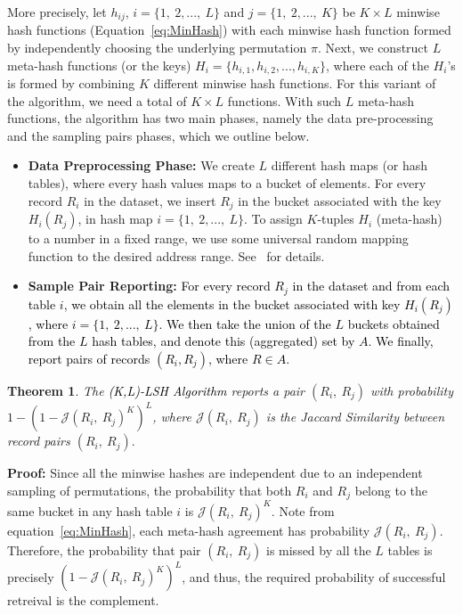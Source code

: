 \documentclass{imsart}
\newtheorem{theorem}{Theorem}
\begin{document}
More precisely, let $h_{ij}$, $i = \{1, \ 2,...,\ L\}$ and $j = \{1, \ 2,...,\ K\}$ be $K \times L$ minwise hash functions (Equation~\ref{eq:MinHash}) with each minwise hash function formed by independently choosing the underlying permutation $\pi$. Next, we construct $L$ meta-hash functions (or the keys) $H_i = \{h_{i,1}, h_{i,2},...,h_{i,K}\}$, where each of the $H_i$'s is formed by combining $K$ different minwise hash functions. For this variant of the algorithm, we need a total of $K \times L$ functions. With such $L$ meta-hash functions, the algorithm has two main phases, namely the data pre-processing and the sampling pairs phases, which we outline below.

\begin{itemize}
  \item {\bf Data Preprocessing Phase:} We create $L$ different hash maps (or hash tables), where every hash values maps to a bucket of elements.  For every record $R_i$ in the dataset, we insert $R_j$ in the bucket associated  with the key $H_i(R_j)$, in hash map $i = \{1, \ 2, ..., \ L\}$. To assign $K$-tuples $H_i$ (meta-hash) to a number in a fixed range, we use some universal random mapping function to the desired address range. See~\cite{Report:E2LSH, 2017arXiv170901190W} for details.
  \item {\bf Sample Pair Reporting:} \textcolor{black}{For every record $R_j$ in the dataset and from each table $i$, we obtain all the elements in the bucket associated with key $H_i(R_j)$, where $i = \{1,\ 2,...,\ L\}$. We then take the union of the $L$ buckets obtained from the $L$ hash tables, and denote this (aggregated) set by $A.$ We finally, report pairs of records $(R_i, R_j)$, where $R \in A$.}
\end{itemize}

\begin{theorem}
The \textcolor{black}{(K,L)-LSH Algorithm} reports a pair $(R_i,\ R_j)$ with probability $1 - (1-\mathcal{J}(R_i,\ R_j)^K)^L$, where $\mathcal{J}(R_i,\ R_j)$ is the Jaccard Similarity between record pairs $(R_i,\ R_j).$
\end{theorem}
{\bf Proof:} Since all the minwise hashes are independent due to an independent sampling of permutations, the probability that both $R_i$ and $R_j$ belong to the same bucket in any hash table $i$ is $\mathcal{J}(R_i,\ R_j)^K$. Note from equation~\ref{eq:MinHash}, each meta-hash agreement has probability $\mathcal{J}(R_i,\ R_j)$. Therefore, the probability that pair $(R_i, \ R_j)$ is missed by all the $L$ tables is precisely $(1-\mathcal{J}(R_i,\ R_j)^K)^L$, and thus, the required probability of successful retreival is the complement.
\end{document}
